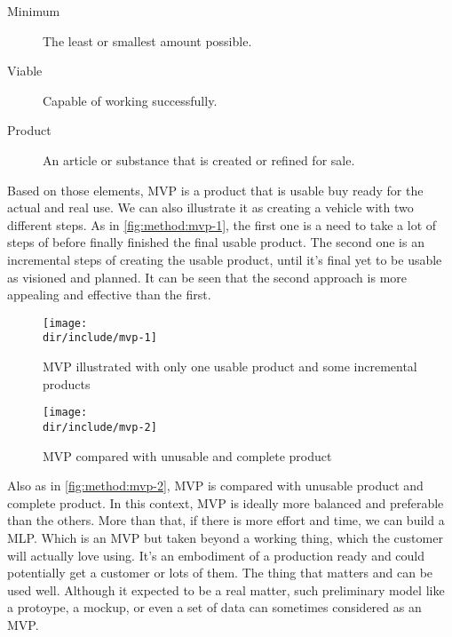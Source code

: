 \begin{description}
  \item[Minimum] The least or smallest amount possible.
  \item[Viable] Capable of working successfully.
  \item[Product] An article or substance that is created or refined for sale.
\end{description}

Based on those elements, \ac{MVP} is a product that is usable buy ready for the actual and real use.
We can also illustrate it as creating a vehicle with two different steps.
As in \autoref{fig:method:mvp-1}, the first one is a need to take a lot of steps of before finally finished the final usable product.
The second one is an incremental steps of creating the usable product, until it's final yet to be usable as visioned and planned.
It can be seen that the second approach is more appealing and effective than the first.

\begin{figure}[htb]
    \centering
    \texttt{[image: \\dir/include/mvp-1]}
    \caption[MVP illustrated]{MVP illustrated with only one usable product and some incremental products~\autocite{Mercury2014MVP}}
    \label{fig:method:mvp-1}
\end{figure}

\begin{figure}[htb]
    \centering
    \texttt{[image: \\dir/include/mvp-2]}
    \caption[MVP compared]{MVP compared with unusable and complete product~\autocite{Mercury2014MVP}}
    \label{fig:method:mvp-2}
\end{figure}

Also as in \autoref{fig:method:mvp-2}, \ac{MVP} is compared with unusable product and complete product.
In this context, \ac{MVP} is ideally more balanced and preferable than the others.
More than that, if there is more effort and time, we can build a \ac{MLP}.
Which is an \ac{MVP} but taken beyond a working thing, which the customer will actually love using.
It's an embodiment of a production ready and could potentially get a customer or lots of them.
The thing that matters and can be used well.
Although it expected to be a real matter, such preliminary model like a protoype, a mockup, or even a set of data can sometimes considered as an \ac{MVP}.


